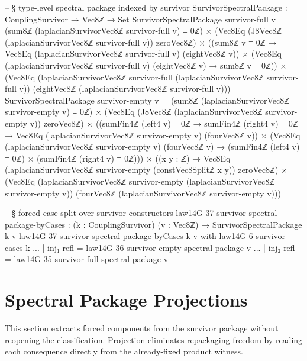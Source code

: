 \documentclass[11pt,a4paper]{book}
\begin{document}
\begin{code}
-- § type-level spectral package indexed by survivor
SurvivorSpectralPackage : CouplingSurvivor → Vec8ℤ → Set
SurvivorSpectralPackage survivor-full v =
  (sum8ℤ (laplacianSurvivorVec8ℤ survivor-full v) ≡ 0ℤ) ×
  (Vec8Eq (J8Vec8ℤ (laplacianSurvivorVec8ℤ survivor-full v)) zeroVec8ℤ) ×
  ((sum8ℤ v ≡ 0ℤ → Vec8Eq (laplacianSurvivorVec8ℤ survivor-full v) (eightVec8ℤ v)) ×
   (Vec8Eq (laplacianSurvivorVec8ℤ survivor-full v) (eightVec8ℤ v) → sum8ℤ v ≡ 0ℤ)) ×
  (Vec8Eq (laplacianSurvivorVec8ℤ survivor-full (laplacianSurvivorVec8ℤ survivor-full v))
         (eightVec8ℤ (laplacianSurvivorVec8ℤ survivor-full v)))
SurvivorSpectralPackage survivor-empty v =
  (sum8ℤ (laplacianSurvivorVec8ℤ survivor-empty v) ≡ 0ℤ) ×
  (Vec8Eq (J8Vec8ℤ (laplacianSurvivorVec8ℤ survivor-empty v)) zeroVec8ℤ) ×
  ((sumFin4ℤ (left4 v) ≡ 0ℤ → sumFin4ℤ (right4 v) ≡ 0ℤ → Vec8Eq (laplacianSurvivorVec8ℤ survivor-empty v) (fourVec8ℤ v)) ×
   (Vec8Eq (laplacianSurvivorVec8ℤ survivor-empty v) (fourVec8ℤ v) → (sumFin4ℤ (left4 v) ≡ 0ℤ) × (sumFin4ℤ (right4 v) ≡ 0ℤ))) ×
  ((x y : ℤ) → Vec8Eq (laplacianSurvivorVec8ℤ survivor-empty (constVec8Splitℤ x y)) zeroVec8ℤ) ×
  (Vec8Eq (laplacianSurvivorVec8ℤ survivor-empty (laplacianSurvivorVec8ℤ survivor-empty v))
         (fourVec8ℤ (laplacianSurvivorVec8ℤ survivor-empty v)))

-- § forced case-split over survivor constructors
law14G-37-survivor-spectral-package-byCases : (k : CouplingSurvivor) (v : Vec8ℤ) → SurvivorSpectralPackage k v
law14G-37-survivor-spectral-package-byCases k v with law14G-6-survivor-cases k
... | inj₁ refl = law14G-36-survivor-empty-spectral-package v
... | inj₂ refl = law14G-35-survivor-full-spectral-package v
\end{code}

\section{Spectral Package Projections}

This section extracts forced components from the survivor package without reopening the classification.
Projection eliminates repackaging freedom by reading each consequence directly from the already-fixed product witness.
\end{document}

